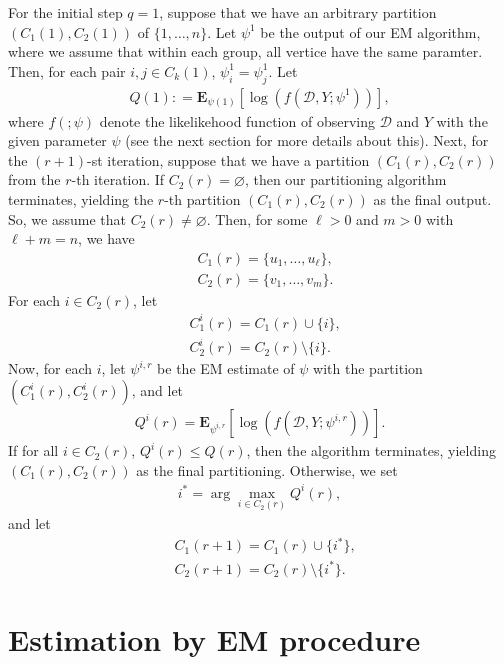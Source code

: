 \documentclass[12pt]{article}%
\begin{document}
For the initial step $q=1$, suppose that we have 
an arbitrary partition $(C_1(1), C_2(1))$ of $\{1,\ldots, n\}$. 
Let $\psi^1$ be the output of our EM algorithm, where we assume that within each group,
all vertice have the same paramter.  Then, for each pair $i, j \in C_k(1)$, $\psi_i^1 = \psi_j^1$.  
Let
\begin{eqnarray}
Q(1) : = \mathbf E_{\psi(1)}\left[\log(f(\mathcal D, Y;\psi^1))\right],
\end{eqnarray}
where $f(;\psi)$ denote the likelikehood function of observing $\mathcal D$ and $Y$ with the given parameter $\psi$ (see the next section for more details about this). 
Next, for the $(r+1)$-st iteration, suppose that we have a partition $(C_1(r), C_2(r))$ from the $r$-th iteration. 
If $C_2(r) = \varnothing$, then our partitioning algorithm terminates, yielding the $r$-th partition 
$(C_1(r), C_2(r))$ as the final output.  So, we assume that $C_2(r)\neq \varnothing$.  Then, for some $\ell > 0$ and $m > 0$ with $\ell + m = n$, we have 
\begin{eqnarray}
&C_1(r) = \{u_1,\ldots, u_\ell\},\\
&C_2(r) = \{v_1,\ldots, v_m\}.
\end{eqnarray} 
For each $i \in C_2(r)$, let 
\begin{eqnarray}
&C_1^{i}(r) = C_1(r) \cup \{i\}, \\
&C_2^{i}(r) = C_2(r) \setminus \{i\}.
\end{eqnarray}
Now, for each $i$, let $\psi^{i,r}$ be the EM estimate of $\psi$ with the partition $(C_1^{i}(r), C_2^{i}(r))$, and let 
\begin{eqnarray}
Q^{i}(r) = \mathbf E_{\psi^{i,r}}\left[\log(f(\mathcal D,Y;\psi^{i,r}))\right].
\end{eqnarray}
If for all $i \in C_2(r)$, $Q^{i}(r) \le Q(r)$, then the algorithm terminates, yielding 
$(C_1(r), C_2(r))$ as the final partitioning.  Otherwise, we set 
\begin{eqnarray}
i^* = \arg\max_{i \in C_2(r)} Q^{i}(r),
\end{eqnarray}
and let 
\begin{eqnarray}
&C_1(r+1) = C_1(r) \cup \{i^*\},\\
&C_2(r+1) = C_2(r) \setminus \{i^*\}.
\end{eqnarray}



\section{Estimation by EM procedure}
\end{document}
